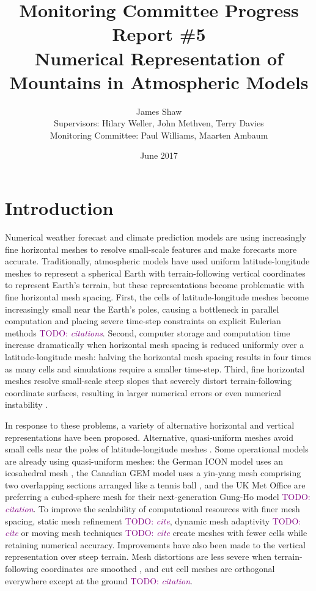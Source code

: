 \documentclass[a4paper,11pt]{article}
\title{
\vspace*{-2em}
Monitoring Committee Progress Report \#5\\
\vspace*{1em}
\Large{Numerical Representation of Mountains in Atmospheric Models}}
\author{James Shaw
\vspace{0.5em} \\
\large{Supervisors: Hilary Weller, John Methven, Terry Davies}
\vspace{0.5em} \\
\large{Monitoring Committee: Paul Williams, Maarten Ambaum}}
\date{June 2017}
\newcommand{\TODO}[1]{\textcolor{purple}{TODO: \emph{#1}}}
\begin{document}
\maketitle

\section{Introduction}

Numerical weather forecast and climate prediction models are using increasingly fine horizontal meshes to resolve small-scale features and make forecasts more accurate.  Traditionally, atmospheric models have used uniform latitude-longitude meshes to represent a spherical Earth with terrain-following vertical coordinates to represent Earth's terrain, but these representations become problematic with fine horizontal mesh spacing.
First, the cells of latitude-longitude meshes become increasingly small near the Earth's poles, causing a bottleneck in parallel computation and placing severe time-step constraints on explicit Eulerian methods \TODO{citations}.
Second, computer storage and computation time increase dramatically when horizontal mesh spacing is reduced uniformly over a latitude-longitude mesh: halving the horizontal mesh spacing results in four times as many cells and simulations require a smaller time-step.
Third, fine horizontal meshes resolve small-scale steep slopes that severely distort terrain-following coordinate surfaces, resulting in larger numerical errors \citep{schaer2002} or even numerical instability \citep{webster2003}.

In response to these problems, a variety of alternative horizontal and vertical representations have been proposed.  Alternative, quasi-uniform meshes avoid small cells near the poles of latitude-longitude meshes \citep{staniforth-thuburn2012}.  Some operational models are already using quasi-uniform meshes: the German ICON model uses an icosahedral mesh \citep{wan2013}, the Canadian GEM model uses a yin-yang mesh comprising two overlapping sections arranged like a tennis ball \citep{qaddouri2011}, and the UK Met Office are preferring a cubed-sphere mesh for their next-generation Gung-Ho model \TODO{citation}.
To improve the scalability of computational resources with finer mesh spacing, static mesh refinement \TODO{cite}, dynamic mesh adaptivity \TODO{cite} or moving mesh techniques \TODO{cite} create meshes with fewer cells while retaining numerical accuracy.
Improvements have also been made to the vertical representation over steep terrain.  Mesh distortions are less severe when terrain-following coordinates are smoothed \citep{leuenberger2010,klemp2011}, and cut cell meshes are orthogonal everywhere except at the ground \TODO{citation}.
\end{document}
